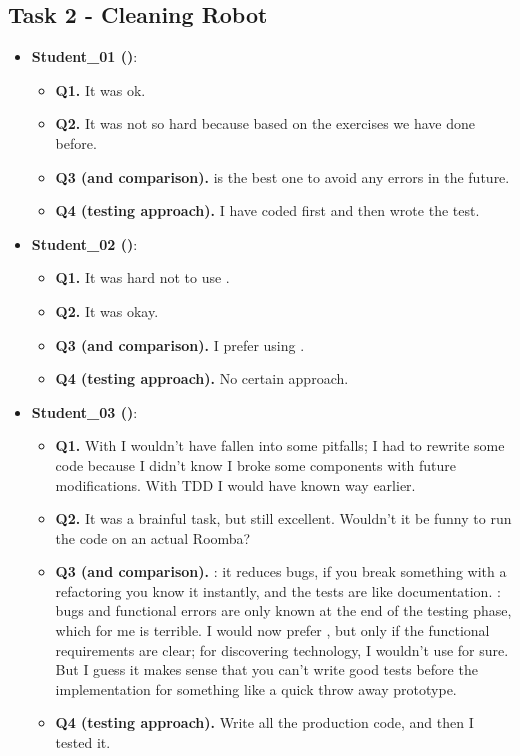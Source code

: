\subsection{Task 2 - Cleaning Robot}
\begin{itemize}
    \item \textbf{Student\_01 (\notdd)}:
    \begin{itemize}
        \item \textbf{Q1.} It was ok.
        \item \textbf{Q2.} It was not so hard because based on the exercises we have done before. 
        \item \textbf{Q3 (\tdd and \notdd comparison).} \tdd is the best one to avoid any errors in the future.
        \item \textbf{Q4 (\notdd testing approach).} I have coded first and then wrote the test.  
    \end{itemize}

    \item \textbf{Student\_02 (\notdd)}:
    \begin{itemize}
        \item \textbf{Q1.} It was hard not to use \tdd.
        \item \textbf{Q2.} It was okay.
        \item \textbf{Q3 (\tdd and \notdd comparison).} I prefer using \tdd.
        \item \textbf{Q4 (\notdd testing approach).} No certain approach.  
    \end{itemize}

    \item \textbf{Student\_03 (\notdd)}:
    \begin{itemize}
        \item \textbf{Q1.} With \tdd I wouldn't have fallen into some pitfalls; I had to rewrite some code because I didn't know I broke some components with future modifications. With TDD I would have known way earlier. 
        \item \textbf{Q2.} It was a brainful task, but still excellent. Wouldn't it be funny to run the code on an actual Roomba?
        \item \textbf{Q3 (\tdd and \notdd comparison).} \tdd: it reduces bugs, if you break something with a refactoring you know it instantly, and the tests are like documentation. \notdd: bugs and functional errors are only known at the end of the testing phase, which for me is terrible. I would now prefer \tdd, but only if the functional requirements are clear; for discovering technology, I wouldn't use \tdd for sure. But I guess it makes sense that you can't write good tests before the implementation for something like a quick throw away prototype.
        \item \textbf{Q4 (\notdd testing approach).} Write all the production code, and then I tested it.
    \end{itemize}


\end{itemize}
